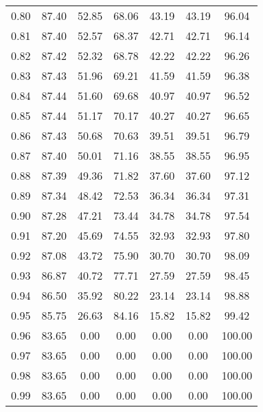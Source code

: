 \begin{tabular}{|c|c|c|c|c|c|c|}
      0.80 &     87.40 &     52.85 &      68.06 &   43.19 &      43.19 &         96.04 \\
      0.81 &     87.40 &     52.57 &      68.37 &   42.71 &      42.71 &         96.14 \\
      0.82 &     87.42 &     52.32 &      68.78 &   42.22 &      42.22 &         96.26 \\
      0.83 &     87.43 &     51.96 &      69.21 &   41.59 &      41.59 &         96.38 \\
      0.84 &     87.44 &     51.60 &      69.68 &   40.97 &      40.97 &         96.52 \\
      0.85 &     87.44 &     51.17 &      70.17 &   40.27 &      40.27 &         96.65 \\
      0.86 &     87.43 &     50.68 &      70.63 &   39.51 &      39.51 &         96.79 \\
      0.87 &     87.40 &     50.01 &      71.16 &   38.55 &      38.55 &         96.95 \\
      0.88 &     87.39 &     49.36 &      71.82 &   37.60 &      37.60 &         97.12 \\
      0.89 &     87.34 &     48.42 &      72.53 &   36.34 &      36.34 &         97.31 \\
      0.90 &     87.28 &     47.21 &      73.44 &   34.78 &      34.78 &         97.54 \\
      0.91 &     87.20 &     45.69 &      74.55 &   32.93 &      32.93 &         97.80 \\
      0.92 &     87.08 &     43.72 &      75.90 &   30.70 &      30.70 &         98.09 \\
      0.93 &     86.87 &     40.72 &      77.71 &   27.59 &      27.59 &         98.45 \\
      0.94 &     86.50 &     35.92 &      80.22 &   23.14 &      23.14 &         98.88 \\
      0.95 &     85.75 &     26.63 &      84.16 &   15.82 &      15.82 &         99.42 \\
      0.96 &     83.65 &      0.00 &       0.00 &    0.00 &       0.00 &        100.00 \\
      0.97 &     83.65 &      0.00 &       0.00 &    0.00 &       0.00 &        100.00 \\
      0.98 &     83.65 &      0.00 &       0.00 &    0.00 &       0.00 &        100.00 \\
      0.99 &     83.65 &      0.00 &       0.00 &    0.00 &       0.00 &        100.00 \\
\bottomrule
\end{tabular}
